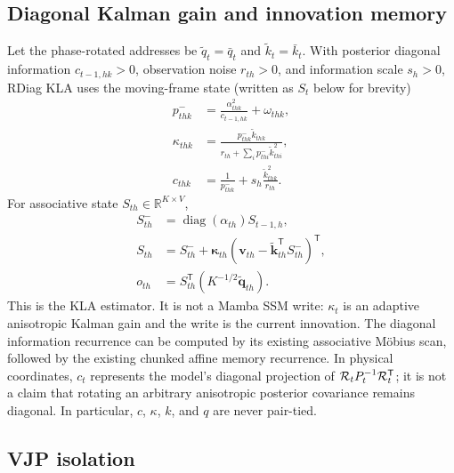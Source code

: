 \documentclass[11pt]{article}
\newcommand{\R}{\mathbb{R}}
\newcommand{\ve}[1]{\boldsymbol{#1}}
\newcommand{\tr}{\mathsf{T}}
\newcommand{\diag}{\operatorname{diag}}
\begin{document}
\subsection{Diagonal Kalman gain and innovation memory}

Let the phase-rotated addresses be $\widetilde q_t=\bar q_t$ and
$\widetilde k_t=\bar k_t$.  With posterior diagonal
information $c_{t-1,hk}>0$, observation noise $r_{th}>0$, and information scale $s_h>0$, RDiag KLA
uses the moving-frame state (written as $S_t$ below for brevity)
\begin{align}
  p^-_{thk}
    &=\frac{\alpha_{thk}^{2}}{c_{t-1,hk}}+\omega_{thk},
    \label{eq:predict-cov}\\
  \kappa_{thk}
    &=\frac{p^-_{thk}\widetilde k_{thk}}
      {r_{th}+\sum_i p^-_{thi}\widetilde k_{thi}^{2}},
    \label{eq:gain}\\
  c_{thk}
    &=\frac{1}{p^-_{thk}}+
      s_h\frac{\widetilde k_{thk}^{2}}{r_{th}}.
  \label{eq:posterior-info}
\end{align}
For associative state $S_{th}\in\R^{K\times V}$,
\begin{align}
  S^-_{th}&=\diag(\alpha_{th})S_{t-1,h},\\
  S_{th}&=S^-_{th}+\ve{\kappa}_{th}
    \left(\ve{v}_{th}-\widetilde{\ve{k}}_{th}^{\tr}S^-_{th}\right)^{\tr},
    \label{eq:kla-state}\\
  o_{th}&=S_{th}^{\tr}\left(K^{-1/2}\widetilde{\ve{q}}_{th}\right).
  \label{eq:kla-read}
\end{align}
This is the KLA estimator.  It is not a Mamba SSM write: $\kappa_t$ is an adaptive anisotropic
Kalman gain and the write is the current innovation.  The diagonal information recurrence can be
computed by its existing associative M\"obius scan, followed by the existing chunked affine memory
recurrence.  In physical coordinates, $c_t$ represents the model's diagonal projection of
${\cal R}_tP_t^{-1}{\cal R}_t^{\tr}$; it is not a claim that rotating an arbitrary anisotropic
posterior covariance remains diagonal.  In particular, $c$, $\kappa$, $k$, and $q$ are never
pair-tied.

\subsection{VJP isolation}
\end{document}
